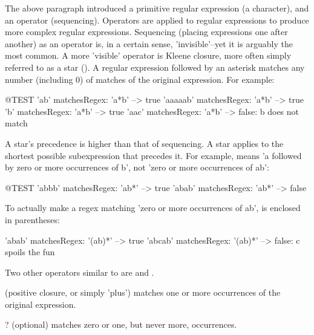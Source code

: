 \documentclass[a4paper,10pt,twoside]{book}
\begin{document}
 The above paragraph introduced a primitive regular expression (a character), and an operator (sequencing). Operators are applied to regular expressions to 
produce more complex regular expressions. Sequencing (placing expressions one 
after another) as an operator is, in a certain sense, 'invisible'--yet it is 
arguably the most common. A more 'visible' operator is Kleene closure, more 
often simply referred to as a star (\ct{*}).  A regular expression followed by an 
asterisk matches any number (including 0) of matches of the original 
expression. For example:

\begin{code}{@TEST} 	
'ab' matchesRegex: 'a*b' --> true 
'aaaaab' matchesRegex: 'a*b' --> true 	
'b' matchesRegex: 'a*b' --> true 	
'aac' matchesRegex: 'a*b'	 --> false: b does not match
\end{code}

 A star's precedence is higher than that of sequencing. A star applies to the 
shortest possible subexpression that precedes it. For example, 
means 'a followed by zero or more occurrences of b', not 'zero or more 
occurrences of ab':

\begin{code}{@TEST}
'abbb' matchesRegex: 'ab*' --> true 
'abab' matchesRegex: 'ab*' --> false
\end{code}

 To actually make a regex matching 'zero or more occurrences of ab',  is enclosed in parentheses:
\begin{code}{} 	
'abab' matchesRegex: '(ab)*' --> true 	
'abcab' matchesRegex: '(ab)*' --> false: c spoils the fun
\end{code} 

Two other operators similar to \ct{*} are \ct{+} and . 

\begin{description}
\item \ct{+} (positive closure, or simply 'plus') matches one or more occurrences of the original expression. 
\item ? (optional) matches zero or one, but never more, occurrences.
\end{description}
\end{document}

